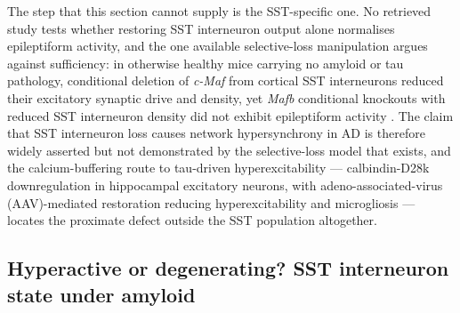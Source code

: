 \documentclass[11pt]{article}
\begin{document}
The step that this section cannot supply is the SST-specific one. No retrieved study tests whether restoring SST interneuron output alone normalises epileptiform activity, and the one available selective-loss manipulation argues against sufficiency: in otherwise healthy mice carrying no amyloid or tau pathology, conditional deletion of \emph{c-Maf} from cortical SST interneurons reduced their excitatory synaptic drive and density, yet \emph{Mafb} conditional knockouts with reduced SST interneuron density did not exhibit epileptiform activity \citep{Leroux2026}. The claim that SST interneuron loss causes network hypersynchrony in AD is therefore widely asserted but not demonstrated by the selective-loss model that exists, and the calcium-buffering route to tau-driven hyperexcitability --- calbindin-D28k downregulation in hippocampal excitatory neurons, with adeno-associated-virus (AAV)-mediated restoration reducing hyperexcitability and microgliosis \citep{Gao2026} --- locates the proximate defect outside the SST population altogether.

\subsection{Hyperactive or degenerating? SST interneuron state under amyloid}
\label{sec-04-hyperactive-or-degenerating}
\end{document}
